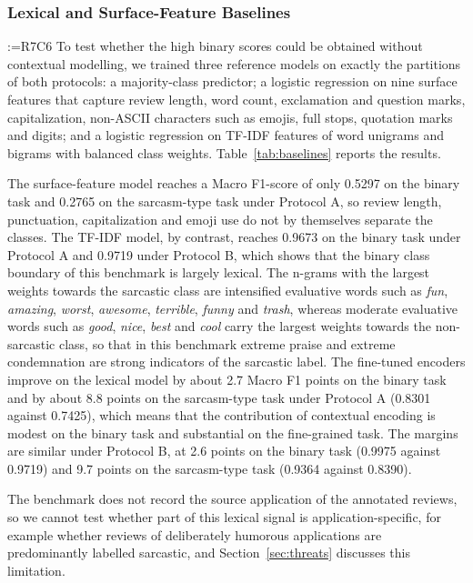 \documentclass[a4paper,fleqn]{cas-sc}
\makeatletter
\newif\iftracked
\newcommand{\rv@setcolour}[1]{%
  \IfStrEq{#1}{R7C7}{\color{rvEdit}}{%
    \IfSubStr{#1}{R5}{\IfSubStr{#1}{R7}{\color{rvBoth}}{\color{rvFive}}}{\color{rvSeven}}}}
\newcommand{\rv@tag}[1]{\textsuperscript{\sffamily\bfseries\scriptsize[\StrSubstitute{#1}{,}{, }]}\,}
\newcommand{\rv@recordone}[1]{%
  \edef\rv@i{#1}%
  \ifcsdef{rv@n@\rv@i}{}{\csgdef{rv@n@\rv@i}{0}}%
  \csxdef{rv@n@\rv@i}{\the\numexpr\csuse{rv@n@\rv@i}+1\relax}%
  \begingroup\edef\@currentlabel{\rv@i}\label{rv:\rv@i:\csuse{rv@n@\rv@i}}\endgroup}
\newcommand{\rv@record}[1]{\@for\rv@id:=#1\do{\expandafter\rv@recordone\expandafter{\rv@id}}}
\DeclareRobustCommand{\rcx}[2]{\iftracked{\rv@setcolour{#1}\rv@tag{#1}#2}\else#2\fi}
\newenvironment{rcblock}[1]{\rv@record{#1}\iftracked\rv@setcolour{#1}\leavevmode\rv@tag{#1}\fi\ignorespaces}{\par}
\makeatother
\begin{document}
\subsubsection{\texorpdfstring{\rcx{R7C6}{Lexical and Surface-Feature Baselines}}{Lexical and Surface-Feature Baselines}}
\label{sec:baselines}
\begin{rcblock}{R7C6}
To test whether the high binary scores could be obtained without contextual modelling, we trained three reference models on exactly the partitions of both protocols: a majority-class predictor; a logistic regression on nine surface features that capture review length, word count, exclamation and question marks, capitalization, non-ASCII characters such as emojis, full stops, quotation marks and digits; and a logistic regression on TF-IDF features of word unigrams and bigrams with balanced class weights. Table~\ref{tab:baselines} reports the results.

The surface-feature model reaches a Macro F1-score of only 0.5297 on the binary task and 0.2765 on the sarcasm-type task under Protocol A, so review length, punctuation, capitalization and emoji use do not by themselves separate the classes. The TF-IDF model, by contrast, reaches 0.9673 on the binary task under Protocol A and 0.9719 under Protocol B, which shows that the binary class boundary of this benchmark is largely lexical. The n-grams with the largest weights towards the sarcastic class are intensified evaluative words such as \textit{fun}, \textit{amazing}, \textit{worst}, \textit{awesome}, \textit{terrible}, \textit{funny} and \textit{trash}, whereas moderate evaluative words such as \textit{good}, \textit{nice}, \textit{best} and \textit{cool} carry the largest weights towards the non-sarcastic class, so that in this benchmark extreme praise and extreme condemnation are strong indicators of the sarcastic label. The fine-tuned encoders improve on the lexical model by about 2.7 Macro F1 points on the binary task and by about 8.8 points on the sarcasm-type task under Protocol A (0.8301 against 0.7425), which means that the contribution of contextual encoding is modest on the binary task and substantial on the fine-grained task. The margins are similar under Protocol B, at 2.6 points on the binary task (0.9975 against 0.9719) and 9.7 points on the sarcasm-type task (0.9364 against 0.8390).

The benchmark does not record the source application of the annotated reviews, so we cannot test whether part of this lexical signal is application-specific, for example whether reviews of deliberately humorous applications are predominantly labelled sarcastic, and Section~\ref{sec:threats} discusses this limitation.
\end{rcblock}
\end{document}
